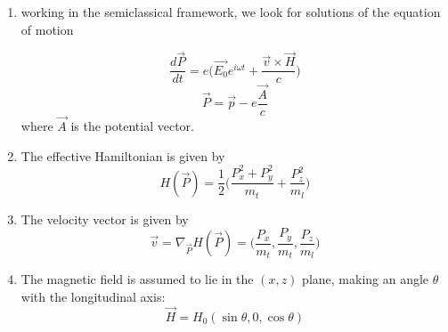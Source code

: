 \begin{enumerate}[label=(\roman*)]
\item working in the semiclassical framework, we look for solutions of
the equation of motion 

\[ \dfrac{d\vec{P}}{dt} = e \biggl( \vec{E_0}e^{i\omega t}+\dfrac{\vec{v} \times
  \vec{H}}{c}\biggr)\]
\[ \vec{P} = \vec{p} - e \dfrac{\vec{A}}{c}\] where $\vec{A}$ is the potential vector.
\item The effective Hamiltonian is given by 
\[ H(\vec{P}) = \dfrac{1}{2} \biggl( \dfrac{P_x^2+P_y^2}{m_t} +
\dfrac{P_z^2}{m_l} \biggr)\]
\item The velocity vector is given by
\[ \vec{v} = \nabla_{\vec{P}} H(\vec{P}) = \biggl(\dfrac{P_x}{m_t}, \dfrac{P_y}{m_t}, \dfrac{P_z}{m_l}\biggr)\]
\item The magnetic field is assumed to lie in the $(x,z)$ plane, making an angle $\theta$
with the longitudinal axis:
\[ \vec{H} = H_0 (\sin \theta, 0, \cos \theta)\]
\end{enumerate}


